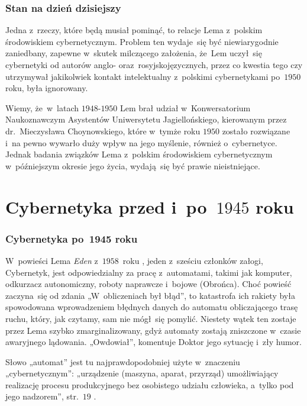 \documentclass[10pt,t]{beamer}
\begin{document}
\begin{frame}
  \frametitle{Stan na dzień dzisiejszy}


  Jedna z~rzeczy, które będą musiał pominąć, to relacje Lema z~polskim
  środowiskiem cybernetycznym. Problem ten wydaje~się być niewiarygodnie
  zaniedbany, zapewne w~skutek milczącego założenia, że~Lem uczył~się
  cybernetyki od autorów anglo- oraz~rosyjskojęzycznych, przez co
  kwestia tego czy utrzymywał jakikolwiek kontakt intelektualny
  z~polskimi cybernetykami po~$1950$ roku, była ignorowany.

  Wiemy, że~w~latach $1948\text{-}1950$ Lem brał udział w~Konwersatorium
  Naukoznawczym Asystentów Uniwersytetu Jagiellońskiego, kierowanym
  przez
  {dr.~Mieczysława Choynowskiego}, które w~tymże roku $1950$ zostało
  rozwiązane i~na pewno wywarło duży wpływ na jego myślenie,
  również o~cybernetyce. Jednak badania związków Lema z~polskim środowiskiem
  cybernetycznym w~późniejszym okresie jego życia, wydają~się być prawie
  nieistniejące.

\end{frame}









\section{Cybernetyka przed i~po~$1945$ roku}


\begin{frame}
  \frametitle{Cybernetyka po~1945 roku}


  W~powieści Lema \textit{Eden} z~$1958$~roku
  \parencite{Lem-Eden-Pub-2019}, jeden z~sześciu członków
  załogi, Cybernetyk, jest odpowiedzialny za pracę z~automatami, takimi
  jak komputer, odkurzacz autonomiczny, roboty naprawcze i~bojowe
  (Obrońca). Choć powieść zaczyna~się od zdania „W~obliczeniach był błąd”,
  to katastrofa ich rakiety była spowodowana wprowadzeniem błędnych danych
  do automatu obliczającego trasę ruchu, który, jak czytamy, sam nie
  mógł~się pomylić. Niestety wątek ten zostaje przez Lema szybko
  zmarginalizowany, gdyż automaty zostają zniszczone w~czasie awaryjnego
  lądowania. „Owdowiał”, komentuje Doktor jego sytuację i~zły humor.

  Słowo „automat” jest tu najprawdopodobniej użyte w~znaczeniu
  „cybernetycznym”: „urządzenie (maszyna, aparat, przyrząd)
  umożliwiający realizację procesu produkcyjnego bez osobistego udziału
  człowieka, a~tylko pod jego nadzorem”, str.~$19$
  \parencite{Szylejko-Szylejko-Cybernetyka-bez-matematyki-Pub-1977}.

\end{frame}
\end{document}

